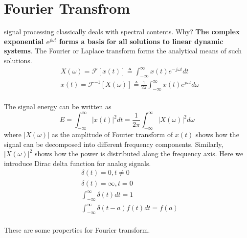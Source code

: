 \section*{Fourier Transfrom}

signal processing classically deals with spectral contents. Why? 
\textbf{The complex exponential $e^{j\omega t}$ forms a basis for all solutions to linear dynamic systems}.
The Fourier or Laplace transform forms the analytical means of such solutions.
\begin{equation}
\begin{aligned}
 &{X}(\omega) = \mathcal{F}[x(t)] \triangleq \int_{-\infty}^{\infty} x(t)e^{-j\omega t} dt \\
 & x(t) = \mathcal{F}^{-1}[{X}(\omega)] \triangleq \frac{1}{2\pi} \int_{-\infty}^{\infty} x(t)e^{j\omega t} d\omega \\
\end{aligned}
\end{equation}

The signal energy can be written as
\begin{equation}
{E} = \int_{-\infty}^{\infty} |x(t)|^2dt = \frac{1}{2\pi}\int_{-\infty}^{\infty}|{X}(\omega)|^2d\omega
\end{equation}
where $|{X}(\omega)|$ as the amplitude of Fourier transform of $x(t)$ shows how the signal can be 
decomposed into different frequency components. Similarly, $|{X}(\omega)|^2$ shows how the power 
is distributed along the frequency axis. Here we introduce Dirac delta function for analog signals. 
\begin{equation}
\begin{aligned}
&\delta(t)  = 0, t \neq 0 \\
&\delta(t)  = \infty, t = 0 \\
&\int_{-\infty}^{\infty}\delta(t) dt = 1\\ 
&\int_{-\infty}^{\infty}\delta(t-a)f(t) dt  = f(a)\\ 
\end{aligned}
\end{equation}

These are some properties for Fourier transform.

